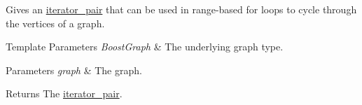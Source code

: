Gives an \hyperlink{classas_1_1iterator__pair}{iterator\+\_\+pair} that can be used in range-\/based for loops to cycle through the vertices of a graph. 


\begin{DoxyTemplParams}{Template Parameters}
{\em Boost\+Graph} & The underlying graph type. \\
\hline
\end{DoxyTemplParams}

\begin{DoxyParams}{Parameters}
{\em graph} & The graph. \\
\hline
\end{DoxyParams}
\begin{DoxyReturn}{Returns}
The \hyperlink{classas_1_1iterator__pair}{iterator\+\_\+pair}. 
\end{DoxyReturn}

